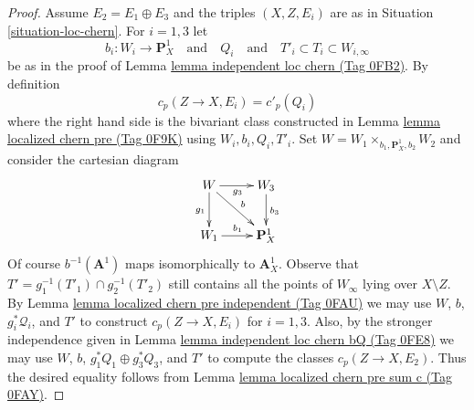 \documentclass{amsart}
\theoremstyle{plain}
\theoremstyle{definition}
\theoremstyle{remark}
\numberwithin{equation}{subsection}
\begin{document}
\begin{proof}
\medskip\noindent
Assume $E_2 = E_1 \oplus E_3$ and the triples $(X, Z, E_i)$
are as in Situation \ref{situation-loc-chern}.
For $i = 1, 3$ let
$$
b_i : W_i \to \mathbf{P}^1_X
\quad\text{and}\quad
Q_i
\quad\text{and}\quad
T'_i \subset T_i \subset W_{i, \infty}
$$
be as in the proof of Lemma \href{https://stacks.math.columbia.edu/tag/0FB2}{lemma independent loc chern (Tag 0FB2)}.
By definition
$$
c_p(Z \to X, E_i) = c'_p(Q_i)
$$
where the right hand side is the bivariant class constructed in
Lemma \href{https://stacks.math.columbia.edu/tag/0F9K}{lemma localized chern pre (Tag 0F9K)} using $W_i, b_i, Q_i, T'_i$.
Set $W = W_1 \times_{b_1, \mathbf{P}^1_X, b_2} W_2$ and consider
the cartesian diagram
$$
\xymatrix{
W \ar[d]_{g_1} \ar[rd]^b \ar[r]_{g_3} & W_3 \ar[d]^{b_3} \\
W_1 \ar[r]^{b_1} & \mathbf{P}^1_X
}
$$
Of course $b^{-1}(\mathbf{A}^1)$ maps isomorphically to $\mathbf{A}^1_X$.
Observe that $T' = g_1^{-1}(T'_1) \cap g_2^{-1}(T'_2)$ still contains
all the points of $W_\infty$ lying over $X \setminus Z$.
By Lemma \href{https://stacks.math.columbia.edu/tag/0FAU}{lemma localized chern pre independent (Tag 0FAU)} we may use
$W$, $b$, $g_i^*\mathcal{Q}_i$, and
$T'$ to construct $c_p(Z \to X, E_i)$ for $i = 1, 3$.
Also, by the stronger independence given in
Lemma \href{https://stacks.math.columbia.edu/tag/0FE8}{lemma independent loc chern bQ (Tag 0FE8)} we may use
$W$, $b$, $g_1^*Q_1 \oplus g_3^*Q_3$, and $T'$
to compute the classes $c_p(Z \to X, E_2)$.
Thus the desired equality follows from
Lemma \href{https://stacks.math.columbia.edu/tag/0FAY}{lemma localized chern pre sum c (Tag 0FAY)}.
\end{proof}
\end{document}
